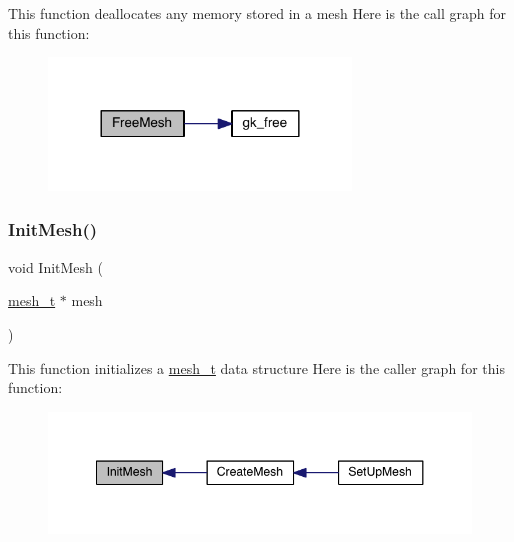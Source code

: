 This function deallocates any memory stored in a mesh Here is the call graph for this function\+:\nopagebreak
\begin{figure}[H]
\begin{center}
\leavevmode
\includegraphics[width=228pt]{a00927_af62123ffaba6a345198b3ec100bd9e18_cgraph}
\end{center}
\end{figure}
\mbox{\label{a00927_a82cd62ea70eaae4395fee538d40cf12b}} 
\subsubsection{\texorpdfstring{Init\+Mesh()}{InitMesh()}}
{\footnotesize\ttfamily void Init\+Mesh (\begin{DoxyParamCaption}\item[{\hyperlink{a00738}{mesh\+\_\+t} $\ast$}]{mesh }\end{DoxyParamCaption})}

This function initializes a \hyperlink{a00738}{mesh\+\_\+t} data structure Here is the caller graph for this function\+:\nopagebreak
\begin{figure}[H]
\begin{center}
\leavevmode
\includegraphics[width=348pt]{a00927_a82cd62ea70eaae4395fee538d40cf12b_icgraph}
\end{center}
\end{figure}
\mbox{\label{a00927_a2cf4672355fcfed039c04a2d1d134136}} 
